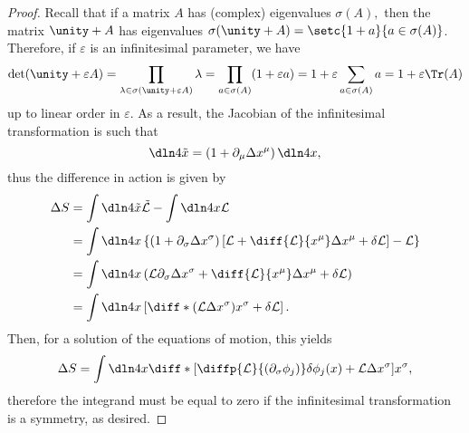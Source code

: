 \documentclass[english]{artigo}
\begin{document}
\begin{proof}
      Recall that if a matrix \(A\) has (complex) eigenvalues \(\sigma(A),\) then the matrix \(\unity + A\) has eigenvalues \(\sigma(\unity + A) = \setc{1 + a}{a \in \sigma(A)}\). Therefore, if \(\varepsilon\) is an infinitesimal parameter, we have
      \begin{equation*}
         \det(\unity + \varepsilon A) = \prod_{\lambda \in \sigma(\unity + \varepsilon A)} \lambda = \prod_{a \in \sigma(A)} (1 + \varepsilon a) = 1 + \varepsilon \sum_{a \in \sigma(A)} a = 1 + \varepsilon \Tr(A)
      \end{equation*}
      up to linear order in \(\varepsilon\). As a result, the Jacobian of the infinitesimal transformation is such that
      \begin{equation*}
         \dln4{\tilde{x}} = \left(1 + \partial_\mu\Delta x^\mu\right) \dln4x,
      \end{equation*}
      thus the difference in action is given by
      \begin{align*}
         \Delta S &= \int \dln4{\tilde{x}} \tilde{\mathcal{L}} - \int \dln4x \mathcal{L}\\
                  &= \int \dln4x \left\{\left(1 + \partial_\sigma \Delta x^\sigma\right)\left[\mathcal{L} + \diff{\mathcal{L}}{x^\mu}\Delta x^\mu + \delta \mathcal{L}\right] - \mathcal{L}\right\}\\
                  &= \int \dln4x \left(\mathcal{L} \partial_\sigma \Delta x^\sigma + \diff{\mathcal{L}}{x^\mu}\Delta x^\mu + \delta \mathcal{L}\right)\\
                  &= \int \dln4x \left[\diff*{\left(\mathcal{L} \Delta x^\sigma\right)}{x^\sigma} + \delta \mathcal{L}\right].
      \end{align*}
      Then, for a solution of the equations of motion, this yields
      \begin{equation*}
         \Delta S = \int \dln4x \diff*{\left[\diffp{\mathcal{L}}{(\partial_\sigma \phi_j)} \delta \phi_j(x) + \mathcal{L} \Delta x^\sigma\right]}{x^\sigma},
      \end{equation*}
      therefore the integrand must be equal to zero if the infinitesimal transformation is a symmetry, as desired.
   \end{proof}

   
   
   
   
\end{document}
